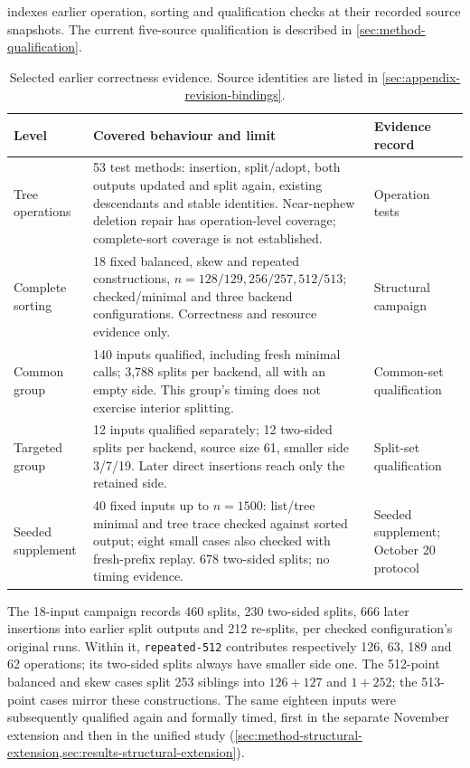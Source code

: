  indexes earlier operation, sorting and
qualification checks at their recorded source snapshots. The current
five-source qualification is described in \cref{sec:method-qualification}.

\begin{table}[htbp]
  \centering
  \small
  \caption{Selected earlier correctness evidence. Source identities are listed
  in \cref{sec:appendix-revision-bindings}.}
  \label{tab:implementation-coverage}
  \begin{tabular}{@{}p{}p{}>{\raggedright\arraybackslash}p{}@{}}
    \toprule
    Level & Covered behaviour and limit & Evidence record \\
    \midrule
    Tree operations & 53 test methods: insertion, split/adopt, both outputs
    updated and split again, existing descendants and stable identities.
    Near-nephew deletion repair has operation-level coverage; complete-sort
    coverage is not established. & Operation tests \\
    Complete sorting & 18 fixed balanced, skew and repeated constructions,
    $n=128/129,256/257,512/513$; checked/minimal and three backend configurations.
    Correctness and resource evidence only. & Structural campaign \\
    Common group & 140 inputs qualified, including fresh minimal calls; 3,788 splits
    per backend, all with an empty side. This group's timing does not
    exercise interior splitting. & Common-set qualification \\
    Targeted group & 12 inputs qualified separately; 12 two-sided splits per
    backend, source size 61, smaller side 3/7/19. Later direct insertions reach
    only the retained side. & Split-set qualification \\
    Seeded supplement & 40 fixed inputs up to $n=1500$: list/tree minimal and
    tree trace checked against sorted output; eight small cases also checked
    with fresh-prefix replay. 678 two-sided splits; no timing evidence. &
    Seeded supplement; October 20 protocol \\
    \bottomrule
  \end{tabular}
\end{table}

The 18-input campaign records 460 splits, 230 two-sided splits, 666 later
insertions into earlier split outputs and 212 re-splits, per checked
configuration's original runs. Within it, \texttt{repeated-512} contributes respectively
126, 63, 189 and 62 operations; its two-sided splits always have smaller side
one. The 512-point balanced and skew cases split 253 siblings into $126+127$
and $1+252$; the 513-point cases mirror these constructions.
The same eighteen inputs were subsequently qualified again and formally
timed, first in the separate November extension and then in the unified study
(\cref{sec:method-structural-extension,sec:results-structural-extension}).


